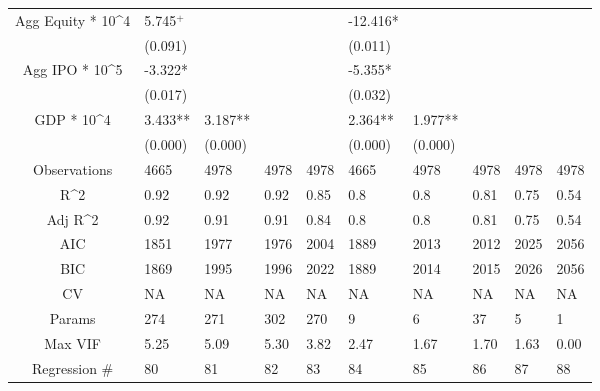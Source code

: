 \documentclass{article}
\begin{document}
\begin{table}[H]
\begin{tabular}{|clllllllll|}
  Agg Equity * 10^4 & 5.745$^{+}$ &  &  &  & -12.416* &  &  &  &  \\ 
   & (0.091) &  &  &  & (0.011) &  &  &  &  \\ 
  Agg IPO * 10^5 & -3.322* &  &  &  & -5.355* &  &  &  &  \\ 
   & (0.017) &  &  &  & (0.032) &  &  &  &  \\ 
  GDP * 10^4 & 3.433** & 3.187** &  &  & 2.364** & 1.977** &  &  &  \\ 
   & (0.000) & (0.000) &  &  & (0.000) & (0.000) &  &  &  \\ 
  \hline 
 Observations & 4665 & 4978 & 4978 & 4978 & 4665 & 4978 & 4978 & 4978 & 4978 \\ 
  R^2 & 0.92 & 0.92 & 0.92 & 0.85 & 0.8 & 0.8 & 0.81 & 0.75 & 0.54 \\ 
  Adj R^2 & 0.92 & 0.91 & 0.91 & 0.84 & 0.8 & 0.8 & 0.81 & 0.75 & 0.54 \\ 
  AIC & 1851 & 1977 & 1976 & 2004 & 1889 & 2013 & 2012 & 2025 & 2056 \\ 
  BIC & 1869 & 1995 & 1996 & 2022 & 1889 & 2014 & 2015 & 2026 & 2056 \\ 
  CV & NA & NA & NA & NA & NA & NA & NA & NA & NA \\ 
  Params & 274 & 271 & 302 & 270 & 9 & 6 & 37 & 5 & 1 \\ 
  Max VIF & 5.25 & 5.09 & 5.30 & 3.82 & 2.47 & 1.67 & 1.70 & 1.63 & 0.00 \\ 
  Regression \# & 80 & 81 & 82 & 83 & 84 & 85 & 86 & 87 & 88 \\ 
   \hline
\end{tabular}
 
\end{table}
\end{document}
